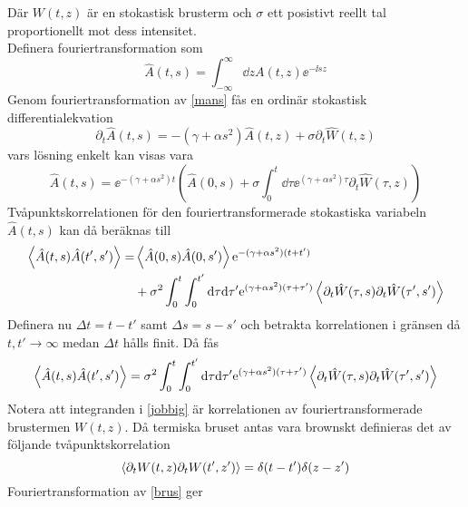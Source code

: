 Där $W(t,z)$ är en stokastisk brusterm och $\sigma$ ett posistivt reellt tal proportionellt mot dess intensitet.\\
Definera fouriertransformation som 
\begin{equation}
    \hat{A}(t,s)=\int_{-\infty}^{\infty}\dd{z} A(t,z)\ee^{-\ii sz}
\end{equation}
Genom fouriertransformation av \eqref{mans} fås en ordinär stokastisk differentialekvation
\begin{equation}
        \partial_{t}\hat{A}(t,s)=-\left(\gamma+\alpha s^2\right)\hat{A}(t,z)+\sigma \partial_{t}\hat{W}(t,z)
\end{equation}
vars lösning enkelt kan visas vara
\begin{equation}
        \hat{A}(t,s)=\ee^{-(\gamma+\alpha s^2)t}\left(\hat{A}(0,s)+\sigma\int_{0}^{t}\dd\tau \ee^{(\gamma+\alpha s^2)\tau}\partial_{t}\hat{W}(\tau,z)\right)
\end{equation}
Tvåpunktskorrelationen för den fouriertransformerade stokastiska variabeln $\hat{A}(t,s)$ kan då beräknas till
\begin{equation}
\begin{aligned}
    \ev{\hat{A}(t,s)\hat{A}(t',s')} =& \ev{\hat{A}(0,s)\hat{A}(0,s')} \ee^{-(\gamma+\alpha s^2)(t+t')}\\ 
    &+ \sigma^2 \int_{0}^{t}\int_{0}^{t'}\dd\tau\dd\tau' \ee^{(\gamma+\alpha s^2)(\tau+\tau')} \ev{\partial_{t}\hat{W}(\tau,s)\partial_{t}\hat{W}(\tau',s')}
\end{aligned}
\end{equation}
Definera nu $\Delta t=t-t'$ samt $\Delta s=s-s'$ och betrakta korrelationen i gränsen då $t,t'\rightarrow\infty$ medan $\Delta t$ hålls finit. Då fås
\begin{equation}\label{jobbig}
     \ev{\hat{A}(t,s)\hat{A}(t',s')}=\sigma^2\int_{0}^{t}\int_{0}^{t'}\dd\tau\dd\tau'\ee^{(\gamma+\alpha s^2)(\tau+\tau')}\ev{\partial_{t}\hat{W}(\tau,s)\partial_{t}\hat{W}(\tau',s')}
\end{equation}
Notera att integranden i \eqref{jobbig} är korrelationen av fouriertransformerade brustermen $W(t,z)$. Då termiska bruset antas vara brownskt definieras det av följande tvåpunktskorrelation
\begin{equation}\label{brus}
    \ev{\partial_{t}W(t,z)\partial_{t}W(t',z')}=\delta(t- t')\delta(z-z')
\end{equation}
Fouriertransformation av \eqref{brus} ger 

